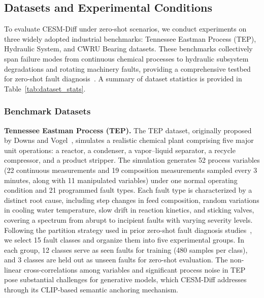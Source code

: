 \subsection{Datasets and Experimental Conditions}
\label{sec:datasets}

To evaluate CESM-Diff under zero-shot scenarios, we conduct experiments on three widely adopted industrial benchmarks: Tennessee Eastman Process (TEP), Hydraulic System, and CWRU Bearing datasets. These benchmarks collectively span failure modes from continuous chemical processes to hydraulic subsystem degradations and rotating machinery faults, providing a comprehensive testbed for zero-shot fault diagnosis~\cite{lei2020applications, zhao2019deep}. A summary of dataset statistics is provided in Table~\ref{tab:dataset_stats}.

\subsubsection{Benchmark Datasets}

\textbf{Tennessee Eastman Process (TEP).} The TEP dataset, originally proposed by Downs and Vogel~\cite{downs1993plant}, simulates a realistic chemical plant comprising five major unit operations: a reactor, a condenser, a vapor--liquid separator, a recycle compressor, and a product stripper. The simulation generates 52 process variables (22 continuous measurements and 19 composition measurements sampled every 3 minutes, along with 11 manipulated variables) under one normal operating condition and 21 programmed fault types. Each fault type is characterized by a distinct root cause, including step changes in feed composition, random variations in cooling water temperature, slow drift in reaction kinetics, and sticking valves, covering a spectrum from abrupt to incipient faults with varying severity levels. Following the partition strategy used in prior zero-shot fault diagnosis studies~\cite{feng2021fault}, we select 15 fault classes and organize them into five experimental groups. In each group, 12 classes serve as seen faults for training (480 samples per class), and 3 classes are held out as unseen faults for zero-shot evaluation. The non-linear cross-correlations among variables and significant process noise in TEP pose substantial challenges for generative models, which CESM-Diff addresses through its CLIP-based semantic anchoring mechanism.

